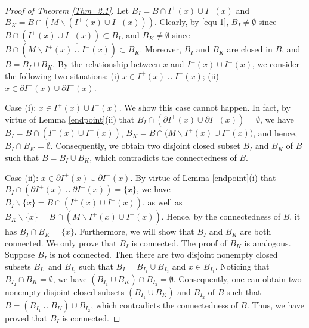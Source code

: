 \documentclass[a4paper,11pt]{article}
\theoremstyle{plain}
\theoremstyle{definition}
\numberwithin{equation}{section}
\begin{document}
\begin{proof}[Proof of Theorem \ref{Thm_2.1}]
		
		Let $B_{I}=B\cap  \overline{I^+(x)\cup I^-(x)}$ and $B_{K}=B\cap (M\backslash (I^+(x)\cup I^-(x)))$. Clearly, by \eqref{equ-1}, $B_{I}\neq\emptyset$ since $B\cap (I^+(x)\cup I^-(x))\subset B_{I}$, and $B_{K}\neq\emptyset$ since $B\cap (M\backslash \overline{I^+(x)\cup I^-(x)})\subset B_{K}$. Moreover, $B_{I}$ and $B_{K}$ are closed in $B$, and $B=B_{I}\cup B_{K}$. By the relationship between $x$ and $I^{+}(x)\cup I^{-}(x)$, we consider the following two situations: (i) $x\in I^{+}(x)\cup I^{-}(x)$; (ii) $x\in \partial I^{+}(x)\cup \partial I^{-}(x)$.

        Case (i): $x\in I^{+}(x)\cup I^{-}(x)$. We show this case cannot happen. In fact, by virtue of Lemma \ref{endpoint}(ii) that $B_{I}\cap (\partial I^{+}(x)\cup \partial I^{-}(x))=\emptyset$, we have $B_{I}=B\cap  (I^+(x)\cup I^-(x))$, $B_{K}=B\cap (M\backslash \overline{I^+(x)\cup I^-(x))}$, and hence, $B_{I}\cap B_{K}=\emptyset$. Consequently, we obtain two disjoint closed subset $B_{I}$ and $B_{K}$ of $B$ such that $B=B_{I}\cup B_{K}$, which contradicts the connectedness of $B$.
        
		Case (ii): $x\in \partial I^{+}(x)\cup \partial I^{-}(x)$. By virtue of Lemma \ref{endpoint}(i) that $B_{I}\cap (\partial I^{+}(x)\cup \partial I^{-}(x))=\{x\}$, we have $B_{I}\backslash\{x\}=B\cap (I^+(x)\cup I^-(x))$, as well as $B_{K}\backslash\{x\}= B\cap (M\backslash\overline{I^+(x)\cup I^-(x)})$. Hence, by the connectedness of $B$, it has $B_{I}\cap B_{K}=\{x\}$.
		Furthermore, we will show that $B_{I}$ and $B_{K}$ are both connected. 
		We only prove that $B_I$ is connected. The proof of $B_K$ is analogous. Suppose $B_I$ is not connected. Then there are two disjoint nonempty closed subsets $B_{I_{1}}$ and $B_{I_{2}}$ such that $B_{I}=B_{I_{1}}\cup B_{I_{2}}$ and $x\in B_{I_{1}}$.
		Noticing that $B_{I_{2}}\cap B_{K}=\emptyset$,
		we have $(B_{I_{1}}\cup B_{K})\cap B_{I_{2}}=\emptyset$.
		Consequently, one can obtain two nonempty disjoint closed subsets $(B_{I_{1}}\cup B_{K})$ and $B_{I_{2}}$ of $B$ such that $B=(B_{I_{1}}\cup B_{K})\cup B_{I_{2}}$, which contradicts the connectedness of $B$. Thus, we have proved that $B_I$ is connected.
		

\end{proof}
\end{document}
